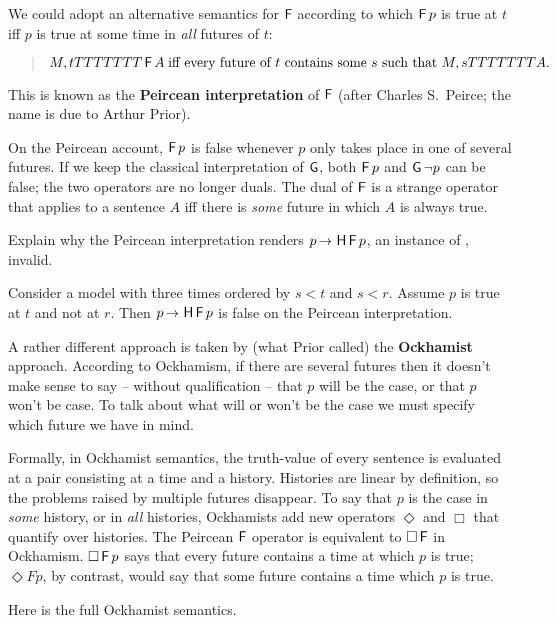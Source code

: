 
We could adopt an alternative semantics for $\operatorname{\mathsf{F}}$ according to which $\operatorname{\mathsf{F}} p$
is true at $t$ iff $p$ is true at some time in \emph{all} futures of $t$:
%
\begin{quote}
  $M,t TTTTTTT \operatorname{\mathsf{F}} A \;\text{iff every future of $t$ contains some $s$ such that $M,s TTTTTTT A$}.$
\end{quote}
This is known as the \textbf{Peircean interpretation} of $\operatorname{\mathsf{F}}$ (after
Charles S.\ Peirce; the name is due to Arthur Prior).

On the Peircean account, $\operatorname{\mathsf{F}} p$ is false whenever $p$ only takes place in one
of several futures. If we keep the classical interpretation of $\operatorname{\mathsf{G}}$, both
$\operatorname{\mathsf{F}} p$ and $\operatorname{\mathsf{G}} \neg p$ can be false; the two operators are no longer duals.
The dual of $\operatorname{\mathsf{F}}$ is a strange operator that applies to a sentence $A$ iff there
is \emph{some} future in which $A$ is always true.

\begin{exercise}
  Explain why the Peircean interpretation renders $p \to \tH\tF p$, an instance
  of , invalid.
\end{exercise}
\begin{solution}
  Consider a model with three times ordered by $s<t$ and $s<r$. Assume $p$ is true at $t$ and not at $r$. Then $p \to \tH\tF p$ is false on the Peircean interpretation.
\end{solution}

A rather different approach is taken by (what Prior called) the
\textbf{Ockhamist} approach. According to Ockhamism, if there are several
futures then it doesn't make sense to say -- without qualification -- that $p$
will be the case, or that $p$ won't be case. To talk about what will or won't be
the case we must specify which future we have in mind.

Formally, in Ockhamist semantics, the truth-value of every sentence is evaluated
at a pair consisting at a time and a history. Histories are linear by
definition, so the problems raised by multiple futures disappear. To say that
$p$ is the case in \emph{some} history, or in \emph{all} histories, Ockhamists
add new operators $\Diamond$ and $\Box$ that quantify over histories. The
Peircean $\operatorname{\mathsf{F}}$ operator is equivalent to $\Box \operatorname{\mathsf{F}}$ in Ockhamism. $\Box \operatorname{\mathsf{F}} p$
says that every future contains a time at which $p$ is true; $\Diamond Fp$, by
contrast, would say that some future contains a time which $p$ is true.

Here is the full Ockhamist semantics.

